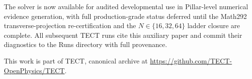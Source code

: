 The solver is now available for audited developmental use in
Pillar-level numerical evidence generation, with full
production-grade status deferred until the Math292
transverse-projection re-certification and the
$N \in \{16, 32, 64\}$ ladder closure are complete. All subsequent
TECT runs cite this auxiliary paper and commit their diagnostics to
the Runs directory with full provenance.

\begin{acknowledgments}
This work is part of TECT, canonical archive at
\url{https://github.com/TECT-OpenPhysics/TECT}.
\end{acknowledgments}





